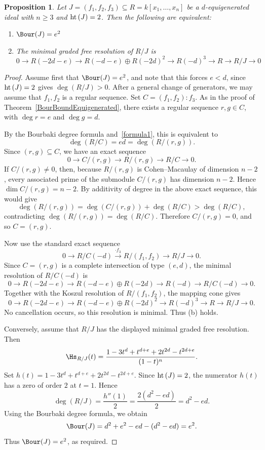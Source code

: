 \documentclass[11pt]{amsart} %
\newtheorem{Proposition}[Theorem]{Proposition}
\theoremstyle{definition}
\def\hht{{\rm ht}\,}
\def\hht{{\rm ht}\,}
\begin{document}
\begin{Proposition}\label{prop:BourJ-max-res}
Let $J=(f_1,f_2,f_3)\subseteq R=k[x_1,\ldots,x_n]$ be a $d$-equigenerated ideal with $n\geq 3$ and $\hht(J)=2$.  Then the following are equivalent:
\begin{enumerate}
    \item[(a)] $\Bour(J)=e^2$
    \item[(b)] The minimal graded free resolution of $R/J$ is
    \[0\to R(-2d-e)\to R(-d-e)\oplus R(-2d)^2\to R(-d)^3\to R \to R/J \to 0\]
\end{enumerate}
\end{Proposition}
\begin{proof} 
Assume first that $\Bour(J)=e^2$, and note that this forces $e < d$, since $\hht(J) = 2$ gives $\deg(R/J) > 0$. After a general change of generators, we may assume that $f_1,f_2$ is a regular sequence. Set $C=(f_1,f_2):f_3$. As in the proof of Theorem~\ref{BourBoundEquigenerated}, there exists a regular sequence $r,g\in C$, with
$\deg r=e$ and $\deg g=d$.

By the Bourbaki degree formula and~\eqref{formula1}, this is equivalent to
\[
\deg(R/C)=ed=\deg(R/(r,g)).
\]
Since $(r,g)\subseteq C$, we have an exact sequence
\[
0\to C/(r,g)\to R/(r,g)\to R/C\to 0.
\]
If $C/(r,g)\neq 0$, then, because $R/(r,g)$ is Cohen--Macaulay of dimension $n-2$, every associated prime of the submodule $C/(r,g)$ has dimension $n-2$. Hence $\dim C/(r,g)=n-2$. By additivity of degree in the above exact sequence, this would give
\[
\deg(R/(r,g))=\deg(C/(r,g))+\deg(R/C)>\deg(R/C),
\]
contradicting $\deg(R/(r,g))=\deg(R/C)$. Therefore $C/(r,g)=0$, and so
$C=(r,g)$.

Now use the standard exact sequence
\[
0\to R/C(-d)\xrightarrow{\cdot f_3} R/(f_1,f_2)\to R/J\to 0.
\]
Since $C=(r,g)$ is a complete intersection of type $(e,d)$, the minimal
resolution of $R/C(-d)$ is
\[
0\to R(-2d-e)\to R(-d-e)\oplus R(-2d)\to R(-d)\to R/C(-d)\to 0.
\]
Together with the Koszul resolution of $R/(f_1,f_2)$, the mapping cone gives
\[
0\to R(-2d-e)\to R(-d-e)\oplus R(-2d)^2
\to R(-d)^3\to R\to R/J\to 0.
\]
No cancellation occurs, so this resolution is minimal. Thus (b) holds.

Conversely, assume that $R/J$ has the displayed minimal graded free resolution. Then
\[
\Hs_{R/J}(t)=
\frac{1-3t^d+t^{d+e}+2t^{2d}-t^{2d+e}}{(1-t)^n}.
\]
Set $h(t)=1-3t^d+t^{d+e}+2t^{2d}-t^{2d+e}$. Since $\hht(J)=2$, the numerator $h(t)$ has a zero of order $2$ at $t=1$. Hence
\[
\deg(R/J)=\frac{h''(1)}{2}=\frac{2(d^2-ed)}{2}=d^2-ed.
\]
Using the Bourbaki degree formula, we obtain
\[
\Bour(J)=d^2+e^2-ed-(d^2-ed)=e^2.
\]
Thus $\Bour(J)=e^2$, as required.
\end{proof}
\end{document}
